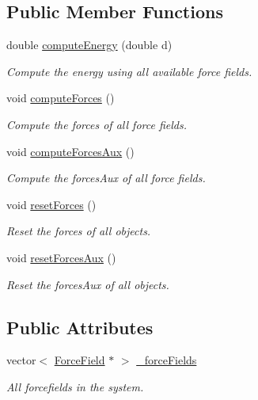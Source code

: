 \subsection*{Public Member Functions}
\begin{DoxyCompactItemize}
\item 
double \hyperlink{classForceFieldManager_a4486efaded29a64191cffa889cc349b2}{compute\+Energy} (double d)
\begin{DoxyCompactList}\small\item\em Compute the energy using all available force fields. \end{DoxyCompactList}\item 
void \hyperlink{classForceFieldManager_ac1174d87b710cf4847b74f3299efa76b}{compute\+Forces} ()
\begin{DoxyCompactList}\small\item\em Compute the forces of all force fields. \end{DoxyCompactList}\item 
void \hyperlink{classForceFieldManager_a2d8ebee8f7cc448665c934f81f93b64e}{compute\+Forces\+Aux} ()
\begin{DoxyCompactList}\small\item\em Compute the forces\+Aux of all force fields. \end{DoxyCompactList}\item 
void \hyperlink{classForceFieldManager_ac18b465afbff0d31980f4a10d72891fe}{reset\+Forces} ()
\begin{DoxyCompactList}\small\item\em Reset the forces of all objects. \end{DoxyCompactList}\item 
void \hyperlink{classForceFieldManager_a1bd25a71eb4bea1accc9dddfb813759a}{reset\+Forces\+Aux} ()
\begin{DoxyCompactList}\small\item\em Reset the forces\+Aux of all objects. \end{DoxyCompactList}\end{DoxyCompactItemize}
\subsection*{Public Attributes}
\begin{DoxyCompactItemize}
\item 
vector$<$ \hyperlink{classForceField}{Force\+Field} $\ast$ $>$ \hyperlink{classForceFieldManager_a1236a49ff3af26520cb0ffa0662983eb}{\+\_\+force\+Fields}
\begin{DoxyCompactList}\small\item\em All forcefields in the system. \end{DoxyCompactList}\end{DoxyCompactItemize}


